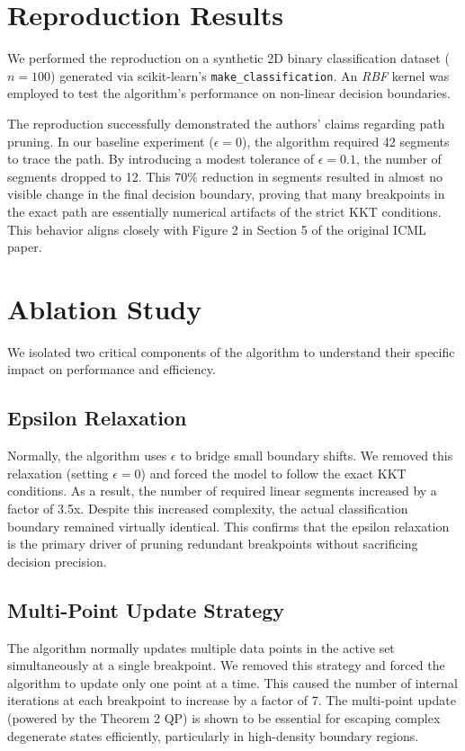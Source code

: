 \documentclass[journal,10pt,twocolumn,oneside]{IEEEtran}
\begin{document}
\section{Reproduction Results}
We performed the reproduction on a synthetic 2D binary classification dataset ($n=100$) generated via scikit-learn's \texttt{make\_classification}. An \textit{RBF} kernel was employed to test the algorithm's performance on non-linear decision boundaries.

The reproduction successfully demonstrated the authors' claims regarding path pruning. In our baseline experiment ($\epsilon = 0$), the algorithm required 42 segments to trace the path. By introducing a modest tolerance of $\epsilon = 0.1$, the number of segments dropped to 12. This 70\% reduction in segments resulted in almost no visible change in the final decision boundary, proving that many breakpoints in the exact path are essentially numerical artifacts of the strict KKT conditions. This behavior aligns closely with Figure 2 in Section 5 of the original ICML paper.

\section{Ablation Study}
We isolated two critical components of the algorithm to understand their specific impact on performance and efficiency.

\subsection{Epsilon Relaxation}
Normally, the algorithm uses $\epsilon$ to bridge small boundary shifts. We removed this relaxation (setting $\epsilon = 0$) and forced the model to follow the exact KKT conditions. As a result, the number of required linear segments increased by a factor of 3.5x. Despite this increased complexity, the actual classification boundary remained virtually identical. This confirms that the epsilon relaxation is the primary driver of pruning redundant breakpoints without sacrificing decision precision.

\subsection{Multi-Point Update Strategy}
The algorithm normally updates multiple data points in the active set simultaneously at a single breakpoint. We removed this strategy and forced the algorithm to update only one point at a time. This caused the number of internal iterations at each breakpoint to increase by a factor of 7. The multi-point update (powered by the Theorem 2 QP) is shown to be essential for escaping complex degenerate states efficiently, particularly in high-density boundary regions.
\end{document}
